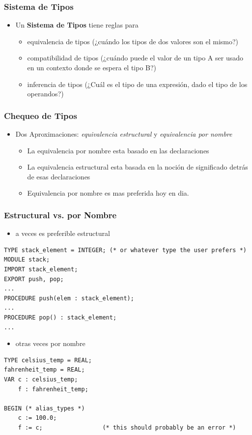 \documentclass[11pt]{article}
\begin{document}
\subsubsection*{Sistema de Tipos}
\label{sec:orgheadline4}
\begin{itemize}
\item Un \textbf{Sistema de Tipos} tiene reglas para
\begin{itemize}
\item equivalencia de tipos (¿cuándo los tipos de dos valores son el mismo?)
\item compatibilidad de tipos (¿cuándo puede el valor de un tipo A ser
usado en un contexto donde se espera el tipo B?)
\item inferencia de tipos (¿Cuál es el tipo de una expresión, dado el
tipo de los operandos?)
\end{itemize}
\end{itemize}

\subsubsection*{Chequeo de Tipos}
\label{sec:orgheadline5}
\begin{itemize}
\item Dos Aproximaciones: \emph{equivalencia estructural} y \emph{equivalencia por nombre}
\begin{itemize}
\item La equivalencia por nombre esta basado en las declaraciones
\item La equivalencia estructural esta basada en la noción de
significado detrás de esas declaraciones
\item Equivalencia por nombre es mas preferida hoy en dia.
\end{itemize}
\end{itemize}

\subsubsection*{Estructural vs. por Nombre}
\label{sec:orgheadline6}
\begin{itemize}
\item a veces es preferible estructural
\end{itemize}
\begin{verbatim}
TYPE stack_element = INTEGER; (* or whatever type the user prefers *) 
MODULE stack; 
IMPORT stack_element; 
EXPORT push, pop; 
...
PROCEDURE push(elem : stack_element); 
...
PROCEDURE pop() : stack_element; 
...
\end{verbatim}
\begin{itemize}
\item otras veces por nombre
\end{itemize}
\begin{verbatim}
TYPE celsius_temp = REAL; 
fahrenheit_temp = REAL; 
VAR c : celsius_temp; 
    f : fahrenheit_temp; 

BEGIN (* alias_types *)
    c := 100.0;
    f := c;                 (* this should probably be an error *)
\end{verbatim}
\end{document}
